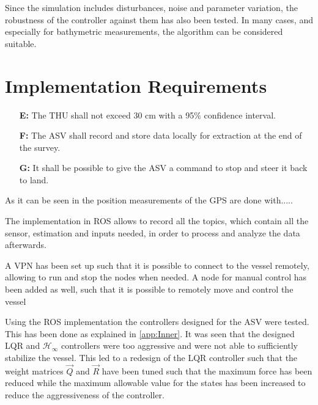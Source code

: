 Since the simulation includes disturbances, noise and parameter variation, the robustness of the controller against them has also been tested. In many cases, and especially for bathymetric measurements, the algorithm can be considered suitable.


\section{Implementation Requirements}
\begin{itemize}
  \item[\textbf{E:}] The THU shall not exceed 30 cm with a 95\% confidence interval.
  \item[\textbf{F:}] The ASV shall record and store data locally for extraction at the end of the survey.
  \item[\textbf{G:}] It shall be possible to give the ASV a command to stop and steer it back to land.
\end{itemize}

As it can be seen in  the position measurements of the GPS are done with.....

The implementation in ROS allows to record all the topics, which contain all the sensor, estimation and inputs needed, in order to process and analyze the data afterwards.

A VPN has been set up such that it is possible to connect to the vessel remotely, allowing to run and stop the nodes when needed. A node for manual control has been added as well, such that it is possible to remotely move and control the vessel

Using the ROS implementation the controllers designed for the ASV were tested. This has been done as explained in \autoref{app:Inner}. It was seen that the designed LQR and $\mathcal{H}_\infty$ controllers were too aggressive and were not able to sufficiently stabilize the vessel. This led to a redesign of the LQR controller such that the weight matrices $\vec{Q}$ and $\vec{R}$ have been tuned such that the maximum force has been reduced while the maximum allowable value for the states has been increased to reduce the aggressiveness of the controller.
  
